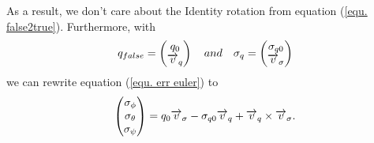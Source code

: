 As a result, we don't care about the Identity rotation from equation (\ref{equ. false2true}). Furthermore, with
\begin{equation}
q_{false} = \begin{pmatrix} q_{0} \\ \overrightarrow{v}_q \end{pmatrix} \quad and \quad
\sigma_q = \begin{pmatrix} \sigma_{q0} \\ \overrightarrow{v}_{\sigma} \end{pmatrix}
\end{equation}
we can rewrite equation (\ref{equ. err euler}) to
\begin{equation}
\begin{pmatrix}\sigma_{\phi} \\ \sigma_{\theta} \\ \sigma_{\psi} \end{pmatrix} = q_{0} \overrightarrow{v}_{\sigma} - \sigma_{q0} \overrightarrow{v}_q + \overrightarrow{v}_q \times \overrightarrow{v}_{\sigma}.
\end{equation}







